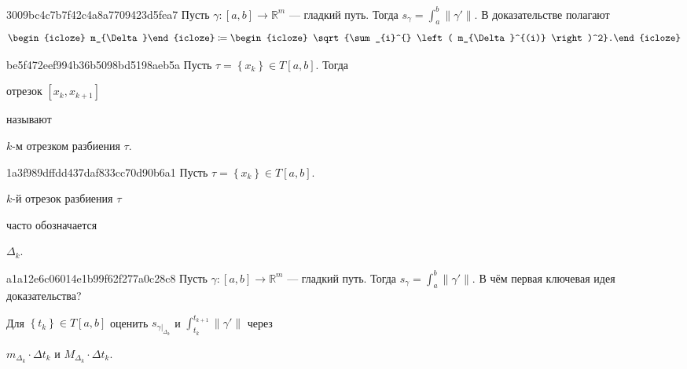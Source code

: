 \begin{note}{3009bc4c7b7f42c4a8a7709423d5fea7}
    Пусть \({ \gamma : [a, b] \to \mathbb R^{m} }\) --- гладкий путь.
    Тогда \({ s_\gamma = \int_{a}^{b} \left\lVert \gamma' \right\rVert }\).
    В доказательстве полагают
    \[
        \begin{icloze}{2}m_{\Delta}\end{icloze} \coloneqq \begin{icloze}{1}\sqrt{\sum_{i}^{} \left( m_{\Delta}^{(i)} \right)^2}.\end{icloze}
    \]
\end{note}

\begin{note}{be5f472eef994b36b5098bd5198aeb5a}
    Пусть \({ \tau = \left\{ x_k \right\} \in T[a, b] }\).
    Тогда \begin{icloze}{1}отрезок \({ [x_k, x_{k + 1}] }\)\end{icloze} называют \begin{icloze}{2}\({ k }\)-м отрезком разбиения \({ \tau }\).\end{icloze}
\end{note}

\begin{note}{1a3f989dffdd437daf833cc70d90b6a1}
    Пусть \({ \tau = \left\{ x_k \right\} \in T[a, b] }\).
    \begin{icloze}{1}\({ k }\)-й отрезок разбиения \({ \tau }\)\end{icloze} часто обозначается \begin{icloze}{2}\({ \Delta_k }\).\end{icloze}
\end{note}

\begin{note}{a1a12e6c06014e1b99f62f277a0c28c8}
    Пусть \({ \gamma : [a, b] \to \mathbb R^{m} }\) --- гладкий путь.
    Тогда \({ s_\gamma = \int_{a}^{b} \left\lVert \gamma' \right\rVert }\).
    В чём первая ключевая идея доказательства?

    \begin{cloze}{1}
        Для \({ \left\{ t_k \right\} \in T[a, b] }\) оценить \({ s_{\gamma|_{\Delta_k}} }\) и \({ \int_{t_k}^{t_{k + 1}} \left\lVert \gamma' \right\rVert }\) через
        \begin{center}
            \({ m_{\Delta_k} \cdot \Delta t_k }\) и \({ M_{\Delta_k} \cdot \Delta t_k }\).
        \end{center}
    \end{cloze}
\end{note}


